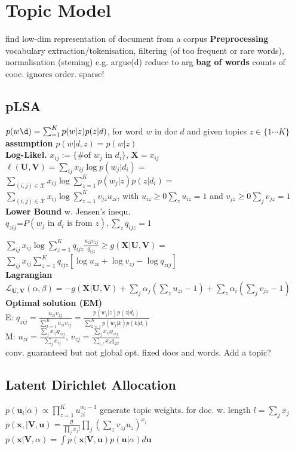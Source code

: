 \section*{Topic Model}
find low-dim representation of document from a corpus
\textbf{Preprocessing} vocabulary extraction/tokenisation, filtering (of too frequent or rare words), normalisation (steming) e.g. argue(d) reduce to arg
\textbf{bag of words} counts of cooc. ignores order. sparse!

\subsection*{pLSA}
 $p(w\d)=\sum_{=1}^Kp(w|z)p(z|d)$, for word $w$ in doc $d$ and given topics $z\in\{1\dotsi K\}$\\
\textbf{assumption} $p(w|d,z){=}p(w|z)$\\
\textbf{Log-Likel.}
 $x_{ij}{:=}\{\text{\# of }w_j\text{ in }d_i\}$, $\mathbf{X}{=}{x_{ij}}$\\
$\ell(\mathbf{U},\mathbf{V}){=}\sum_{ij}x_{ij}\log p(w_j|d_i)=$\\
$\sum_{(i,j)\in\mathcal{X}}x_{ij}\log\sum_{z=1}^Kp(w_j|z)p(z|d_i)=$\\
$\sum_{(i,j)\in\mathcal{X}}x_{ij}\log\sum_{z=1}^Kv_{jz}u_{zi}$, with $u_{iz}{\geq}0\sum_zu_{iz}{=}1$ and $v_{jz}{\geq}0\sum_jv_{jz}{=}1$\\
\textbf{Lower Bound} w. Jensen's inequ.\\
$q_{zij}$=$P(w_j\text{ in }d_i\text{ is from }z), \sum_{z}q_{ijz}=1$

$\sum_{ij}x_{ij}\log\sum_{z=1}^Kq_{ijz}\frac{u_{zi}v_{zj}}{q_{ijz}}{\geq} g(\mathbf{X}|\mathbf{U},\mathbf{V}){=}$\\
$\sum_{ij}x_{ij}\sum_{z=1}^K q_{ijz}[\log u_{zi}{+}\log v_{zj}{-}\log q_{zij}]$\\
\textbf{Lagrangian}
$\mathcal{L}_{\mathbf{U},\mathbf{V}}(\alpha,\beta)=-g(\mathbf{X}|\mathbf{U},\mathbf{V})+\sum_{j}\alpha_j(\sum_zu_{zi}{-}1){+}\sum_{z}\alpha_i(\sum_jv_{jz}{-}1)$
\textbf{Optimal solution (EM)}\\
E: $q_{zij}{=}\frac{u_{zi}v_{zj}}{\sum_{k=1}^Ku_{zi}v_{zj}}{=}\frac{p(w_j|z)p(z|d_i)}{\sum_{k=1}^K p(w_j|k)p(k|d_i)}$\\
M: $u_{zi}{=}\frac{\sum_jx_{ij}q_{zij}}{\sum_jx_{ij}}$, $v_{zj}{=}\frac{\sum_jx_{ij}q_{zij}}{\sum_{i,l}x_{il}q_{zil}}$\\
conv. guaranteed but not global opt.
fixed docs and words. Add a topic?

\subsection*{Latent Dirichlet Allocation}
$p(\mathbf{u}_i|\alpha){\propto}\prod_{z=1}^Ku_{zi}^{\alpha_z-1}$ generate topic weights. for doc. w. length $l=\sum_j x_j$\\
$p(\mathbf{x},|\mathbf{V},\mathbf{u}){=}\frac{l!}{\prod_j x_j!}\prod_j (\sum_z v_{zj}u_z)^{x_j}$\\
$p(\mathbf{x}|\mathbf{V},\alpha){=}\int p(\mathbf{x}|\mathbf{V},\mathbf{u})p(\mathbf{u}|\alpha)d\mathbf{u}$

